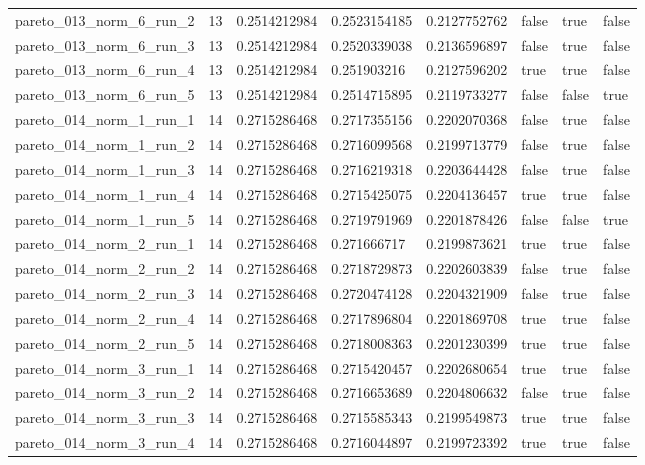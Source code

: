 \begin{tabular}{@{}llllllll@{}}
pareto\_013\_norm\_6\_run\_2 & 13 & 0.2514212984 & 0.2523154185 & 0.2127752762 & false & true & false \\
pareto\_013\_norm\_6\_run\_3 & 13 & 0.2514212984 & 0.2520339038 & 0.2136596897 & false & true & false \\
pareto\_013\_norm\_6\_run\_4 & 13 & 0.2514212984 & 0.251903216 & 0.2127596202 & true & true & false \\
pareto\_013\_norm\_6\_run\_5 & 13 & 0.2514212984 & 0.2514715895 & 0.2119733277 & false & false & true \\
pareto\_014\_norm\_1\_run\_1 & 14 & 0.2715286468 & 0.2717355156 & 0.2202070368 & false & true & false \\
pareto\_014\_norm\_1\_run\_2 & 14 & 0.2715286468 & 0.2716099568 & 0.2199713779 & false & true & false \\
pareto\_014\_norm\_1\_run\_3 & 14 & 0.2715286468 & 0.2716219318 & 0.2203644428 & false & true & false \\
pareto\_014\_norm\_1\_run\_4 & 14 & 0.2715286468 & 0.2715425075 & 0.2204136457 & true & true & false \\
pareto\_014\_norm\_1\_run\_5 & 14 & 0.2715286468 & 0.2719791969 & 0.2201878426 & false & false & true \\
pareto\_014\_norm\_2\_run\_1 & 14 & 0.2715286468 & 0.271666717 & 0.2199873621 & true & true & false \\
pareto\_014\_norm\_2\_run\_2 & 14 & 0.2715286468 & 0.2718729873 & 0.2202603839 & false & true & false \\
pareto\_014\_norm\_2\_run\_3 & 14 & 0.2715286468 & 0.2720474128 & 0.2204321909 & false & true & false \\
pareto\_014\_norm\_2\_run\_4 & 14 & 0.2715286468 & 0.2717896804 & 0.2201869708 & true & true & false \\
pareto\_014\_norm\_2\_run\_5 & 14 & 0.2715286468 & 0.2718008363 & 0.2201230399 & true & true & false \\
pareto\_014\_norm\_3\_run\_1 & 14 & 0.2715286468 & 0.2715420457 & 0.2202680654 & true & true & false \\
pareto\_014\_norm\_3\_run\_2 & 14 & 0.2715286468 & 0.2716653689 & 0.2204806632 & false & true & false \\
pareto\_014\_norm\_3\_run\_3 & 14 & 0.2715286468 & 0.2715585343 & 0.2199549873 & true & true & false \\
pareto\_014\_norm\_3\_run\_4 & 14 & 0.2715286468 & 0.2716044897 & 0.2199723392 & true & true & false \\

\end{tabular}
